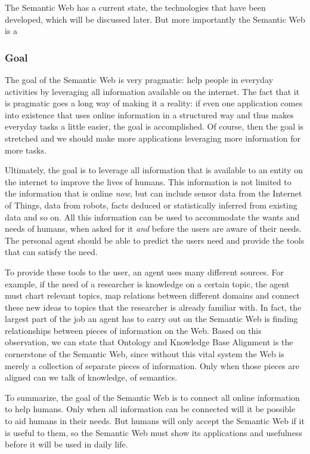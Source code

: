 \documentclass{article}
\begin{document}
 The Semantic Web has a current state, the technologies that have been developed, which will be discussed later. But more importantly the Semantic Web is a 
 
 \subsubsection{Goal}
 The goal of the Semantic Web is very pragmatic: help people in everyday activities by leveraging all information available on the internet. The fact that it is pragmatic goes a long way of making it a reality: if even one application comes into existence that uses online information in a structured way and thus makes everyday tasks a little easier, the goal is accomplished. Of course, then the goal is stretched and we should make more applications leveraging more information for more tasks.
 
 Ultimately, the goal is to leverage all information that is available to an entity on the internet to improve the lives of humans. This information is not limited to the information that is online \emph{now}, but can include sensor data from the Internet of Things, data from robots, facts deduced or statistically inferred from existing data and so on. All this information can be used to accommodate the wants and needs of humans, when asked for it \textit{and} before the users are aware of their needs. The personal agent should be able to predict the users need and provide the tools that can satisfy the need.
 
 To provide these tools to the user, an agent uses many different sources. For example, if the need of a researcher is knowledge on a certain topic, the agent must chart relevant topics, map relations between different domains and connect these new ideas to topics that the researcher is already familiar with. In fact, the largest part of the job an agent has to carry out on the Semantic Web is finding relationships between pieces of information on the Web. Based on this observation, we can state that Ontology and Knowledge Base Alignment is the cornerstone  of the Semantic Web, since without this vital system the Web is merely a collection of separate pieces of information. Only when those pieces are aligned can we talk of knowledge, of semantics.
 
 To summarize, the goal of the Semantic Web is to connect all online information to help humans. Only when all information can be connected will it be possible to aid humans in their needs. But humans will only accept the Semantic Web if it is useful to them, so the Semantic Web must show its applications and usefulness before it will be used in daily life.
\end{document}
